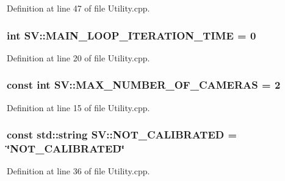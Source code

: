 Definition at line 47 of file Utility.\-cpp.

\hypertarget{namespace_s_v_a778a8d19ba21816aca4e8ca6c2dcd4a2}{
\subsubsection[{M\-A\-I\-N\-\_\-\-L\-O\-O\-P\-\_\-\-I\-T\-E\-R\-A\-T\-I\-O\-N\-\_\-\-T\-I\-M\-E}]{\setlength{\rightskip}{0pt plus 5cm}int S\-V\-::\-M\-A\-I\-N\-\_\-\-L\-O\-O\-P\-\_\-\-I\-T\-E\-R\-A\-T\-I\-O\-N\-\_\-\-T\-I\-M\-E = 0}}\label{namespace_s_v_a778a8d19ba21816aca4e8ca6c2dcd4a2}


Definition at line 20 of file Utility.\-cpp.

\hypertarget{namespace_s_v_aa2acf99b8a3b122f688769ef693c30ae}{
\subsubsection[{M\-A\-X\-\_\-\-N\-U\-M\-B\-E\-R\-\_\-\-O\-F\-\_\-\-C\-A\-M\-E\-R\-A\-S}]{\setlength{\rightskip}{0pt plus 5cm}const int S\-V\-::\-M\-A\-X\-\_\-\-N\-U\-M\-B\-E\-R\-\_\-\-O\-F\-\_\-\-C\-A\-M\-E\-R\-A\-S = 2}}\label{namespace_s_v_aa2acf99b8a3b122f688769ef693c30ae}


Definition at line 15 of file Utility.\-cpp.

\hypertarget{namespace_s_v_af29adc97546d0aacc73089470104b7e6}{
\subsubsection[{N\-O\-T\-\_\-\-C\-A\-L\-I\-B\-R\-A\-T\-E\-D}]{\setlength{\rightskip}{0pt plus 5cm}const std\-::string S\-V\-::\-N\-O\-T\-\_\-\-C\-A\-L\-I\-B\-R\-A\-T\-E\-D = \char`\"{}N\-O\-T\-\_\-\-C\-A\-L\-I\-B\-R\-A\-T\-E\-D\char`\"{}}}\label{namespace_s_v_af29adc97546d0aacc73089470104b7e6}


Definition at line 36 of file Utility.\-cpp.

